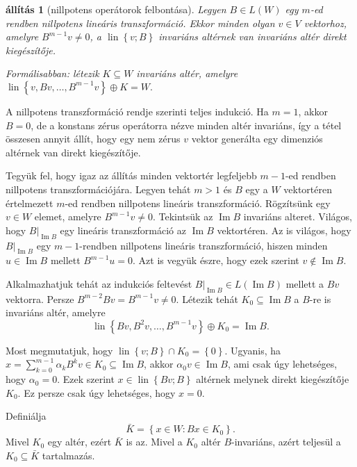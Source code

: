 \documentclass[9pt, a4paper, showtrims]{memoir}
\makeatletter
\renewenvironment{proof}[1][\proofname]
    {\par\pushQED{\qed}%
    \normalfont \topsep6\p@\@plus6\p@\relax
    \trivlist
    \item[\hskip\labelsep
        \itshape
    #1\@addpunct{:}]\ignorespaces}
    {\popQED\endtrivlist\@endpefalse}
\theoremstyle{plain}
\newtheorem{proposition}{állítás}[chapter]
\theoremstyle{remark}
\theoremstyle{definition}
\DeclareMathOperator{\lin}{lin}
\DeclareMathOperator{\im}{Im}
\makeatother
\begin{document}
\begin{proposition}[nillpotens operátorok felbontása]
    Legyen $B\in L\left( W \right)$ egy $m$-ed rendben nillpotens lineáris transzformáció.
    Ekkor minden olyan $v\in V$ vektorhoz, 
    amelyre $B^{m-1}v\neq 0$, a $\lin\left\{ v;B \right\}$ invariáns altérnek van invariáns altér 
    direkt kiegészítője.

    Formálisabban: létezik $K\subseteq W$ invariáns altér, amelyre
    \(
    \lin\left\{ v,Bv,\dots,B^{m-1}v \right\}\oplus K = W.
    \)
    \label{pr:nilpfelb}
\end{proposition}
\begin{proof}
    A nillpotens transzformáció rendje szerinti teljes indukció.
    Ha $m=1$, akkor $B=0$, de a konstans zérus operátorra nézve minden altér invariáns,
    így a tétel összesen annyit állít, hogy egy nem zérus $v$ vektor generálta egy dimenziós altérnek van direkt kiegészítője.

    Tegyük fel, hogy igaz az állítás minden vektortér legfeljebb $m-1$-ed rendben nillpotens transzformációjára.
    Legyen tehát $m>1$ és $B$ egy a $W$ vektortéren értelmezett $m$-ed rendben nillpotens lineáris transzformáció.
    Rögzítsünk egy $v\in W$ elemet, amelyre $B^{m-1}v\neq 0$.
    Tekintsük az $\im B$ invariáns alteret.
    Világos, hogy $B|_{\im B}$ egy lineáris transzformáció az $\im B$ vektortéren.
    Az is világos, hogy $B|_{\im B}$ egy $m-1$-rendben nillpotens lineáris transzformáció, hiszen 
    minden $u\in\im B$ mellett $B^{m-1}u=0$.
    Azt is vegyük észre, hogy ezek szerint $v\notin\im B$.

    Alkalmazhatjuk tehát az indukciós feltevést $B|_{\im B}\in L\left( \im B \right)$ mellett a
    $Bv$ vektorra.
    Persze $B^{m-2}Bv=B^{m-1}v\neq 0$.
    Létezik tehát $K_0\subseteq\im B$ a $B$-re is invariáns altér, amelyre
    \[
        \lin\left\{ Bv,B^2v,\dots,B^{m-1}v \right\}\oplus K_0 = \im B.
    \]

    Most megmutatjuk, hogy $\lin\left\{ v;B \right\}\cap K_0=\left\{ 0 \right\}.$
    Ugyanis, ha 
    $
    x=\sum_{k=0}^{m-1}\alpha_kB^kv\in K_0\subseteq\im B
    $, akkor $\alpha_0v\in\im B$,
    ami csak úgy lehetséges, hogy $\alpha_0=0$.
    Ezek szerint $x\in\lin\left\{ Bv;B \right\}$ altérnek melynek direkt kiegészítője $K_0$.
    Ez persze csak úgy lehetséges, hogy $x=0$.

    Definiálja 
    \[
        \bar{K}=\left\{ x\in W:Bx\in K_0 \right\}.
    \]
    Mivel $K_0$ egy altér, ezért $\bar{K}$ is az.
    Mivel a $K_0$ altér $B$-invariáns, azért teljesül a $K_0\subseteq \bar{K}$ tartalmazás.


\end{proof}
\end{document}
